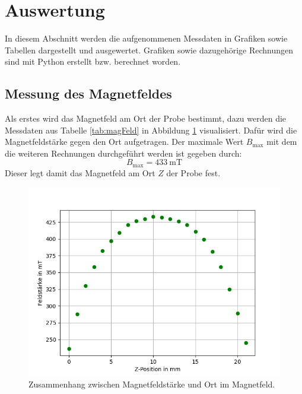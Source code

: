 \newpage
\section{Auswertung}
\label{sec:Auswertung}
In diesem Abschnitt werden die aufgenommenen Messdaten in Grafiken sowie Tabellen dargestellt und ausgewertet. Grafiken sowie dazugehörige Rechnungen sind mit Python \cite{python} erstellt bzw. berechnet worden.

\subsection{Messung des Magnetfeldes}
\label{sec:magFeld}
Als erstes wird das Magnetfeld am Ort der Probe bestimmt, dazu werden die Messdaten aus Tabelle \ref{tab:magFeld} in Abbildung \ref{abb:magFeld} visualisiert. Dafür wird die Magnetfeldstärke gegen den Ort aufgetragen.
Der maximale Wert $B_\mathrm{max}$ mit dem die weiteren Rechnungen durchgeführt werden ist gegeben durch:
\begin{equation}
  B_\mathrm{max}=\SI{433}{\milli\tesla}
\end{equation}
Dieser legt damit das Magnetfeld am Ort $Z$ der Probe fest.
\begin{figure}[h!]
  \centering
  \includegraphics[scale=0.7]{fig/bfeld.png}
  \caption{Zusammenhang zwischen Magnetfeldstärke und Ort im Magnetfeld.}
  \label{abb:magFeld}
\end{figure}
\FloatBarrier

